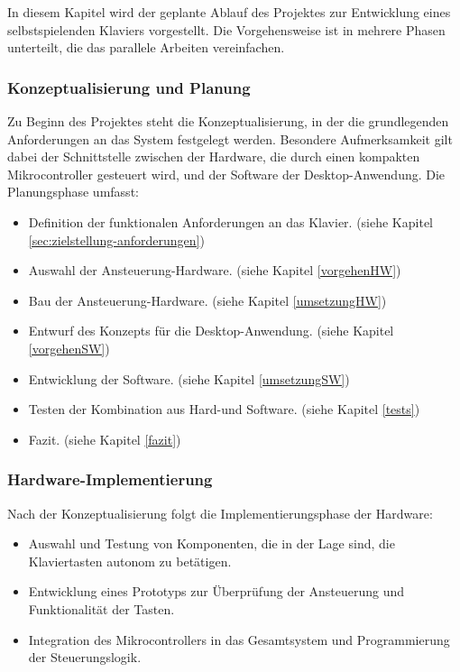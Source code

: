 In diesem Kapitel wird der geplante Ablauf des Projektes zur Entwicklung eines selbstspielenden Klaviers vorgestellt.
Die Vorgehensweise ist in mehrere Phasen unterteilt, die das parallele Arbeiten vereinfachen.

\subsubsection{Konzeptualisierung und Planung}\label{Vorgehensweise - Konzeptualisierung und Planung}

Zu Beginn des Projektes steht die Konzeptualisierung, in der die grundlegenden Anforderungen an das System festgelegt werden.
Besondere Aufmerksamkeit gilt dabei der Schnittstelle zwischen der Hardware, die durch einen kompakten Mikrocontroller gesteuert wird,
und der Software der Desktop-Anwendung.
Die Planungsphase umfasst:

\begin{itemize}
    \item Definition der funktionalen Anforderungen an das Klavier. (siehe Kapitel \ref{sec:zielstellung-anforderungen})
    \item Auswahl der Ansteuerung-Hardware. (siehe Kapitel \ref{vorgehenHW})
    \item Bau der Ansteuerung-Hardware. (siehe Kapitel \ref{umsetzungHW})
    \item Entwurf des Konzepts für die Desktop-Anwendung. (siehe Kapitel \ref{vorgehenSW})
    \item Entwicklung der Software. (siehe Kapitel \ref{umsetzungSW})
    \item Testen der Kombination aus Hard-und Software. (siehe Kapitel \ref{tests})
    \item Fazit. (siehe Kapitel \ref{fazit})
\end{itemize}

\subsubsection{Hardware-Implementierung}\label{Vorgehensweise - Hardware-Implementierung}

Nach der Konzeptualisierung folgt die Implementierungsphase der Hardware:

\begin{itemize}
    \item Auswahl und Testung von Komponenten, die in der Lage sind, die Klaviertasten autonom zu betätigen.
    \item Entwicklung eines Prototyps zur Überprüfung der Ansteuerung und Funktionalität der Tasten.
    \item Integration des Mikrocontrollers in das Gesamtsystem und Programmierung der Steuerungslogik.
\end{itemize}

